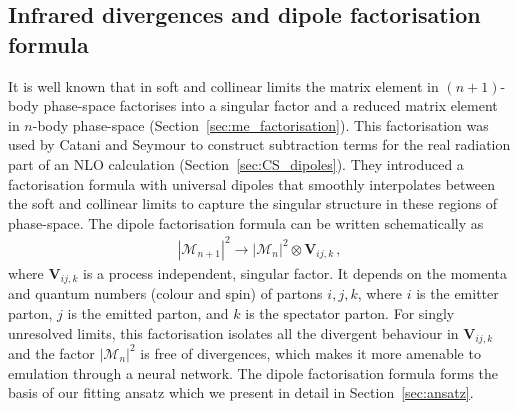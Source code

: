 \documentclass[main.tex]{subfiles}
\begin{document}
\subsection{Infrared divergences and dipole factorisation formula}
It is well known that in soft and collinear limits the matrix element in $(n+1)$-body phase-space factorises into a singular factor and a reduced matrix element in $n$-body phase-space \cite{Altarelli:1977zs,BASSETTO1983201} (Section~\ref{sec:me_factorisation}).
This factorisation was used by Catani and Seymour \cite{Catani:1996vz} to construct subtraction terms for the real radiation part of an NLO calculation (Section~\ref{sec:CS_dipoles}).
They introduced a factorisation formula with universal dipoles that smoothly interpolates 
between the soft and collinear limits to capture the singular structure in these regions of phase-space.
The dipole factorisation formula can be written schematically as
\begin{eqnarray}\label{eq:factorisation}
    |\mathcal{M}_{n+1}|^{2} \rightarrow |\mathcal{M}_{n}|^{2} \otimes \mathbf{V}_{ij,k} \, ,
\end{eqnarray}
where $\mathbf{V}_{ij,k}$ is a process independent, singular factor. It depends on the momenta and quantum numbers (colour and spin) of partons $i,j,k$, where $i$ is the emitter parton, 
$j$ is the emitted parton, and $k$ is the spectator parton.
For singly unresolved limits, this factorisation isolates all the divergent behaviour in $\mathbf{V}_{ij,k}$ and the factor $|\mathcal{M}_{n}|^{2}$ is free of divergences, which makes 
it more amenable to emulation through a neural network.
The dipole factorisation formula forms the basis of our fitting ansatz which we present in detail in Section~\ref{sec:ansatz}.
\end{document}
